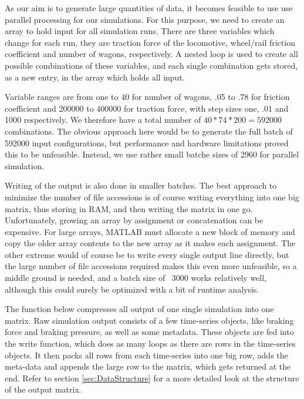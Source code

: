 \par\noindent
As our aim is to generate large quantities of data, it becomes feasible to use use parallel processing for our simulations. For this purpose, we need to create an array to hold input for all simulation runs. There are three variables which change for each run, they are traction force of the locomotive, wheel/rail friction coefficient and number of wagons, respectively. A nested loop is used to create all possible combinations of these variables, and each single combination gets stored, as a new entry, in the array which holds all input.
\par
Variable ranges are from one to 40 for number of wagons, .05 to .78 for friction coefficient and 200000 to 400000 for traction force, with step sizes one, .01 and 1000 respectively. We therefore have a total number of $40*74*200 =  592000$ combinations. The obvious approach here would be to generate the full batch of 592000 input configurations, but performance and hardware limitations proved this to be unfeasible. Instead, we use rather small batche sizes of 2960 for parallel simulation.
\par
Writing of the output is also done in smaller batches. The best approach to minimize the number of file accessions is of course writing everything into one big matrix, thus storing in RAM, and then writing the matrix in one go. Unfortunately, growing an array by assignment or concatenation can be expensive. For large arrays, MATLAB must allocate a new block of memory and copy the older array contents to the new array as it makes each assignment. The other extreme would of course be to write every single output line directly, but the large number of file accessions required makes this even more unfeasible, so a middle ground is needed, and a batch size of ~3000 works relatively well, although this could surely be optimized with a bit of runtime analysis.
\par
The function below compresses all output of one single simulation into one matrix. Raw simulation output consists of a few time-series objects, like braking force and braking pressure, as well as some metadata. These objects are fed into the write function, which does as many loops as there are rows in the time-series objects. It then packs all rows from each time-series into one big row, adds the meta-data and appends the large row to the matrix, which gets returned at the end. Refer to section \ref{sec:DataStructure} for a more detailed look at the structure of the output matrix.

